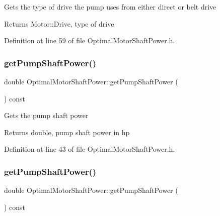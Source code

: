 Gets the type of drive the pump uses from either direct or belt drive \begin{DoxyReturn}{Returns}
Motor\+::\+Drive, type of drive 
\end{DoxyReturn}


Definition at line 59 of file Optimal\+Motor\+Shaft\+Power.\+h.

\mbox{\label{class_optimal_motor_shaft_power_aca7bb632c659ecf2ebf3cb9fdb23626f}} 
\subsubsection{\texorpdfstring{get\+Pump\+Shaft\+Power()}{getPumpShaftPower()}\hspace{0.1cm}{\footnotesize\ttfamily [1/3]}}
{\footnotesize\ttfamily double Optimal\+Motor\+Shaft\+Power\+::get\+Pump\+Shaft\+Power (\begin{DoxyParamCaption}{ }\end{DoxyParamCaption}) const\hspace{0.3cm}{\ttfamily [inline]}}

Gets the pump shaft power \begin{DoxyReturn}{Returns}
double, pump shaft power in hp 
\end{DoxyReturn}


Definition at line 43 of file Optimal\+Motor\+Shaft\+Power.\+h.

\mbox{\label{class_optimal_motor_shaft_power_aca7bb632c659ecf2ebf3cb9fdb23626f}} 
\subsubsection{\texorpdfstring{get\+Pump\+Shaft\+Power()}{getPumpShaftPower()}\hspace{0.1cm}{\footnotesize\ttfamily [2/3]}}
{\footnotesize\ttfamily double Optimal\+Motor\+Shaft\+Power\+::get\+Pump\+Shaft\+Power (\begin{DoxyParamCaption}{ }\end{DoxyParamCaption}) const\hspace{0.3cm}{\ttfamily [inline]}}

